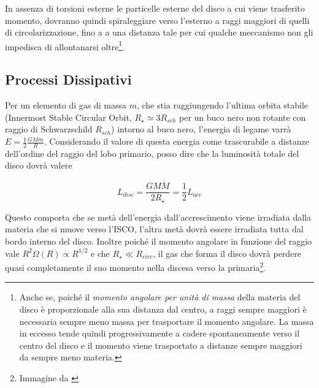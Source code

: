 \documentclass[a4paperbi]{article}
\begin{document}
	In assenza di torsioni esterne le particelle esterne del disco a cui viene trasferito momento, dovranno quindi spiraleggiare verso l'esterno a raggi maggiori di quelli di circolarizzazione, fino a a una distanza tale per cui qualche meccanismo non gli impedisca di allontanarsi oltre\footnote{Anche se, poiché il \textit{momento angolare per unità di massa} della materia del disco è proporzionale alla sua distanza dal centro, a raggi sempre maggiori è necessaria sempre meno massa per trasportare il momento angolare. La massa in eccesso tende quindi progressivamente a cadere spontaneamente verso il centro del disco e il momento viene trasportato a distanze sempre maggiori da sempre meno materia.}.
		
\subsection{Processi Dissipativi}
	Per un elemento di gas di massa $m$, che stia raggiungendo l'ultima orbita stabile (Innermost Stable Circular Orbit,  $R_{\star}\simeq 3R_{sch}$ per un buco nero non rotante con raggio di Schwarzschild $R_{sch}$) intorno al buco nero, l'energia di legame varrà $E=\frac{1}{2}\frac{GMm}{R}$. Considerando il valore di questa energia come trascurabile a distanze dell'ordine del raggio del lobo primario, posso dire che la luminosità totale del disco dovrà valere
	
	\begin{equation}
		L_{disc}=\frac{GM\dot{M}}{2R_{\star}}=\frac{1}{2}L_{acc}
	\end{equation}

	Questo comporta che se metà dell'energia dall'accrescimento viene irradiata dalla materia che si muove verso l'ISCO, l'altra metà dovrà essere irradiata tutta dal bordo interno del disco. Inoltre poiché il momento angolare in funzione del raggio vale $R^2\Omega(R)\propto R^{1/2}$ e che $R_{\star}\ll R_{circ}$, il gas che forma il disco dovrà perdere quasi completamente il suo momento nella discesa verso la primaria\footnote{Immagine da \cite{ShakuraSunyaev1973}}.	
\end{document}
